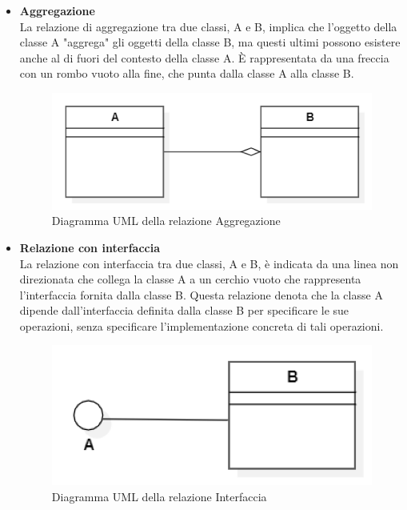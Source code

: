 \begin{itemize}
    \item \textbf{Aggregazione}
    \\La relazione di aggregazione tra due classi, A e B, implica che l'oggetto della classe A "aggrega" gli oggetti della classe B, ma questi ultimi possono esistere anche al di fuori del contesto della classe A. È rappresentata da una freccia con un rombo vuoto alla fine, che punta dalla classe A alla classe B. 
    \begin{figure}[h]
        \centering
        \includegraphics[width=0.5\linewidth]{img/aggregazione.PNG}
        \caption{Diagramma UML della relazione Aggregazione}
    \end{figure}

    
    \item \textbf{Relazione con interfaccia}
    \\La relazione con interfaccia tra due classi, A e B, è indicata da una linea non direzionata che collega la classe A a un cerchio vuoto che rappresenta l'interfaccia fornita dalla classe B. Questa relazione denota che la classe A dipende dall'interfaccia definita dalla classe B per specificare le sue operazioni, senza specificare l'implementazione concreta di tali operazioni. 
    \begin{figure}[h]
        \centering
        \includegraphics[width=0.5\linewidth]{img/interfaccia.PNG}
        \caption{Diagramma UML della relazione Interfaccia}
    \end{figure}
    
    
\end{itemize}

